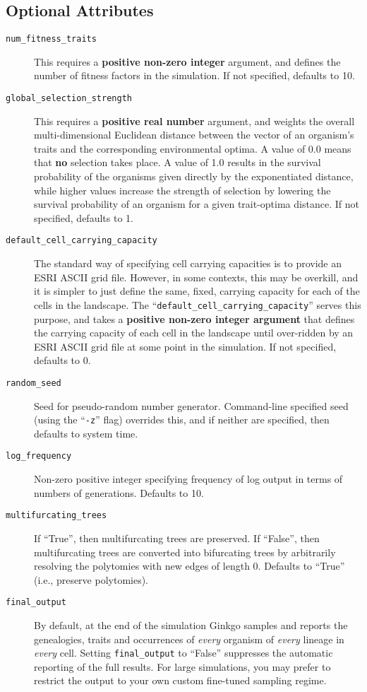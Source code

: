 \documentclass[11pt]{article}
\newcommand{\xmlattr}[1]{{\tt\textcolor{xmlattr}{#1}}}
\begin{document}
\subsection{Optional Attributes}
\begin{description}
	\item[\xmlattr{num\_fitness\_traits}] This requires a \textbf{positive non-zero integer} argument, and defines the number of fitness factors in the simulation. If not specified, defaults to 10.
	\item[\xmlattr{global\_selection\_strength}] This requires a \textbf{positive real number} argument, and weights the overall multi-dimensional Euclidean distance between the vector of an organism's traits and the corresponding environmental optima. A value of 0.0 means that \textbf{no} selection takes place. A value of 1.0 results in the survival probability of the organisms given directly by the exponentiated distance, while higher values increase the strength of selection by lowering the survival probability of an organism for a given trait-optima distance. If not specified, defaults to 1.
	\item[\xmlattr{default\_cell\_carrying\_capacity}] The standard way of specifying cell carrying capacities is to provide an ESRI ASCII grid file. However, in some contexts, this may be overkill, and it is simpler to just define the same, fixed, carrying capacity for each of the cells in the landscape. The ``\verb=default_cell_carrying_capacity='' serves this purpose, and takes a \textbf{positive non-zero integer argument} that defines the carrying capacity of each cell in the landscape until over-ridden by an ESRI ASCII grid file at some point in the simulation. If not specified, defaults to 0.
	\item[\xmlattr{random\_seed}] Seed for pseudo-random number generator. Command-line specified seed (using the ``{\tt -z}'' flag) overrides this, and if neither are specified, then defaults to system time.
	\item[\xmlattr{log\_frequency}] Non-zero positive integer specifying frequency of log output in terms of numbers of generations. Defaults to 10.
	\item[\xmlattr{multifurcating\_trees}] If ``True'', then multifurcating trees are preserved. If ``False'', then multifurcating trees are converted into bifurcating trees by arbitrarily resolving the polytomies with new edges of length 0. Defaults to ``True'' (i.e., preserve polytomies).
	\item[\xmlattr{final\_output}] By default, at the end of the simulation Ginkgo samples and reports the genealogies, traits and occurrences of \textit{every} organism of \textit{every} lineage in \textit{every} cell.  Setting \xmlattr{final\_output} to ``False'' suppresses the automatic reporting of the full results. For large simulations, you may prefer to restrict the output to your own custom fine-tuned sampling regime.

\end{description}
\end{document}
